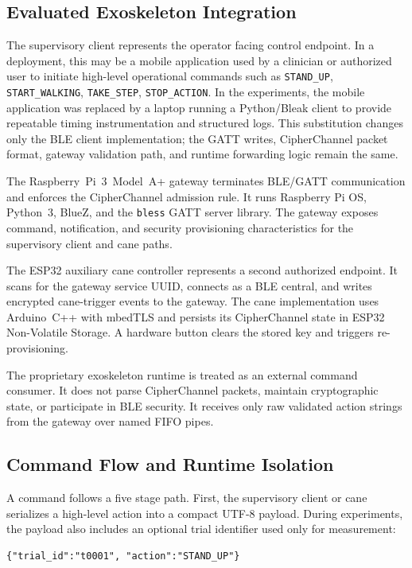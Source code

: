 \documentclass[journal]{IEEEtran}
\begin{document}
\subsection{Evaluated Exoskeleton Integration}

The supervisory client represents the operator facing control endpoint. In a deployment, this may be a mobile application used by a clinician or authorized user to initiate high-level operational commands such as \texttt{STAND\_UP}, \texttt{START\_WALKING}, \texttt{TAKE\_STEP}, \texttt{STOP\_ACTION}. In the experiments, the mobile application was replaced by a laptop running a Python/Bleak client to provide repeatable timing instrumentation and structured logs. This substitution changes only the BLE client implementation; the GATT writes, CipherChannel packet format, gateway validation path, and runtime forwarding logic remain the same.

The Raspberry~Pi~3~Model~A+ gateway terminates BLE/GATT communication and enforces the CipherChannel admission rule. It runs Raspberry Pi OS, Python~3, BlueZ, and the \texttt{bless} GATT server library. The gateway exposes command, notification, and security provisioning characteristics for the supervisory client and cane paths.

The ESP32 auxiliary cane controller represents a second authorized endpoint. It scans for the gateway service UUID, connects as a BLE central, and writes encrypted cane-trigger events to the gateway. The cane implementation uses Arduino~C++ with mbedTLS and persists its CipherChannel state in ESP32 Non-Volatile Storage. A hardware button clears the stored key and triggers re-provisioning.

The proprietary exoskeleton runtime is treated as an external command consumer. It does not parse CipherChannel packets, maintain cryptographic state, or participate in BLE security. It receives only raw validated action strings from the gateway over named FIFO pipes.

\subsection{Command Flow and Runtime Isolation}

A command follows a five stage path. First, the supervisory client or cane serializes a high-level action into a compact UTF-8 payload. During experiments, the payload also includes an optional trial identifier used only for measurement:

\begin{verbatim}
{"trial_id":"t0001", "action":"STAND_UP"}
\end{verbatim}
\end{document}
